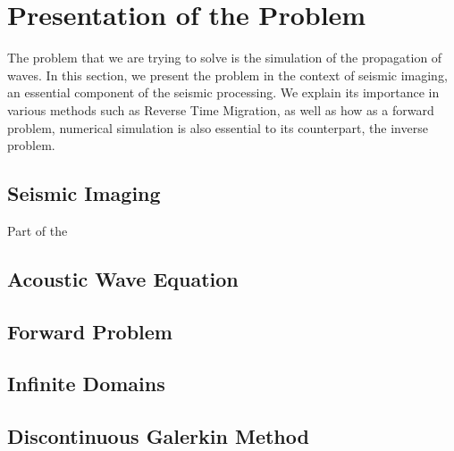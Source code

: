 \newpage
\section{Presentation of the Problem}

The problem that we are trying to solve is the simulation of the propagation of waves. In this section, we present the problem in the context of seismic imaging, an essential component of the seismic processing. We explain its importance in various methods such as Reverse Time Migration, as well as how as a forward problem, numerical simulation is also essential to its counterpart, the inverse problem.

\subsection{Seismic Imaging}

Part of the 

\subsection{Acoustic Wave Equation}

\subsection{Forward Problem}


\subsection{Infinite Domains}

\subsection{Discontinuous Galerkin Method}





